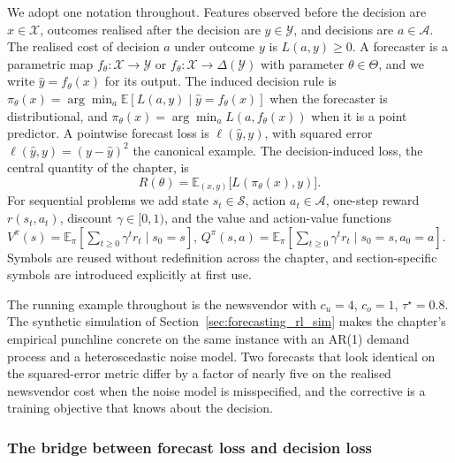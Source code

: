 We adopt one notation throughout. Features observed before the decision
are $x \in \mathcal X$, outcomes realised after the decision are
$y \in \mathcal Y$, and decisions are $a \in \mathcal A$. The realised cost
of decision $a$ under outcome $y$ is $L(a, y) \ge 0$. A forecaster is a
parametric map $f_\theta : \mathcal X \to \mathcal Y$ or
$f_\theta : \mathcal X \to \Delta(\mathcal Y)$ with parameter
$\theta \in \Theta$, and we write $\hat y = f_\theta(x)$ for its output.
The induced decision rule is
$\pi_\theta(x) = \arg\min_a \mathbb E[L(a, y) \mid \hat y = f_\theta(x)]$
when the forecaster is distributional, and
$\pi_\theta(x) = \arg\min_a L(a, f_\theta(x))$ when it is a point
predictor. A pointwise forecast loss is $\ell(\hat y, y)$, with squared
error $\ell(\hat y, y) = (y - \hat y)^2$ the canonical example. The
decision-induced loss, the central quantity of the chapter, is
\begin{equation}
R(\theta) = \mathbb E_{(x, y)}\bigl[ L(\pi_\theta(x), y) \bigr].
\label{eq:decision_loss}
\end{equation}
For sequential problems we add state $s_t \in \mathcal S$, action
$a_t \in \mathcal A$, one-step reward $r(s_t, a_t)$, discount
$\gamma \in [0, 1)$, and the value and action-value functions
$V^\pi(s) = \mathbb E_\pi[\sum_{t \ge 0} \gamma^t r_t \mid s_0 = s]$,
$Q^\pi(s, a) = \mathbb E_\pi[\sum_{t \ge 0} \gamma^t r_t \mid s_0 = s,
a_0 = a]$. Symbols are reused without redefinition across the chapter, and
section-specific symbols are introduced explicitly at first use.

The running example throughout is the newsvendor with $c_u = 4$,
$c_o = 1$, $\tau^\star = 0.8$. The synthetic simulation of
Section~\ref{sec:forecasting_rl_sim} makes the chapter's empirical
punchline concrete on the same instance with an AR(1) demand process and a
heteroscedastic noise model. Two forecasts that look identical on the
squared-error metric differ by a factor of nearly five on the realised
newsvendor cost when the noise model is misspecified, and the corrective
is a training objective that knows about the decision.

\subsubsection{The bridge between forecast loss and decision loss}
\label{sec:bridge}


